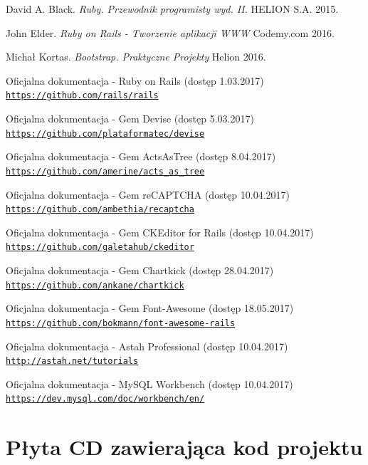 \documentclass[brudnopis]{xmgr}
\begin{document}
\begin{thebibliography}{9}

David A. Black.
\textit{Ruby. Przewodnik programisty wyd. II.}
HELION S.A. 2015.

John Elder.
\textit{Ruby on Rails - Tworzenie aplikacji WWW}
Codemy.com 2016.

Michał Kortas.
\textit{Bootstrap. Praktyczne Projekty}
Helion 2016.

Oficjalna dokumentacja - Ruby on Rails (dostęp 1.03.2017)
\\\texttt{\url{https://github.com/rails/rails}} 


Oficjalna dokumentacja - Gem Devise (dostęp 5.03.2017)
\\\texttt{\url{https://github.com/plataformatec/devise}} 


Oficjalna dokumentacja - Gem ActsAsTree (dostęp 8.04.2017)
\\\texttt{\url{https://github.com/amerine/acts_as_tree}} 


Oficjalna dokumentacja - Gem reCAPTCHA  (dostęp 10.04.2017)
\\\texttt{\url{https://github.com/ambethia/recaptcha}}


Oficjalna dokumentacja - Gem CKEditor for Rails (dostęp 10.04.2017)
\\\texttt{\url{https://github.com/galetahub/ckeditor}} 


Oficjalna dokumentacja - Gem Chartkick (dostęp 28.04.2017)
\\\texttt{\url{https://github.com/ankane/chartkick}} 


Oficjalna dokumentacja - Gem Font-Awesome (dostęp 18.05.2017)
\\\texttt{\url{https://github.com/bokmann/font-awesome-rails}} 


Oficjalna dokumentacja - Astah Professional (dostęp 10.04.2017)
\\\texttt{\url{http://astah.net/tutorials}} 


Oficjalna dokumentacja - MySQL Workbench (dostęp 10.04.2017)
\\\texttt{\url{https://dev.mysql.com/doc/workbench/en/}}

\end{thebibliography} 

\appendix
\chapter{Płyta CD zawierająca kod projektu}


\listoffigures


\oswiadczenie
\end{document}
